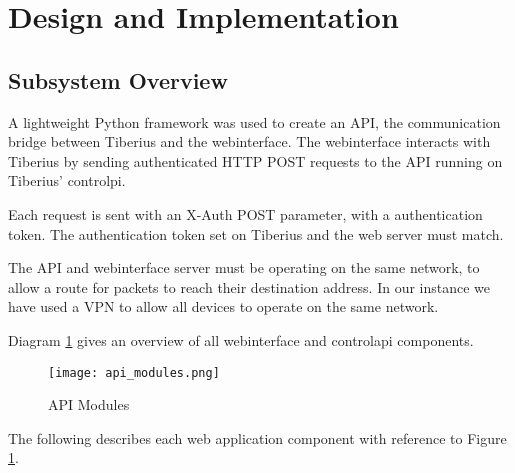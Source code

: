 \section{Design and Implementation}

\subsection{Subsystem Overview}
\label{sec:web_subsystem_overview}
A lightweight Python framework was used to create an API, the communication bridge between Tiberius and the \gls{webinterface}. The \gls{webinterface} interacts with Tiberius by sending authenticated \gls{HTTP} \gls{POST} requests to the \gls{API} running on Tiberius' \gls{controlpi}.

Each request is sent with an X-Auth \gls{POST} parameter, with a authentication token. The authentication token set on Tiberius and the web server must match.

The \gls{API} and \gls{webinterface} server must be operating on the same network, to allow a route for packets to reach their destination address. In our instance we have used a \gls{VPN} to allow all devices to operate on the same network.

Diagram \ref{fig:api-modules} gives an overview of all \gls{webinterface} and \gls{controlapi} components.
\newline

\begin{figure}[!htb]
\begin{center}
\texttt{[image: api\_modules.png]}
\end{center}
\caption{API Modules}
\label{fig:api-modules}
\end{figure}

The following describes each web application component with reference to Figure \ref{fig:api-modules}.

